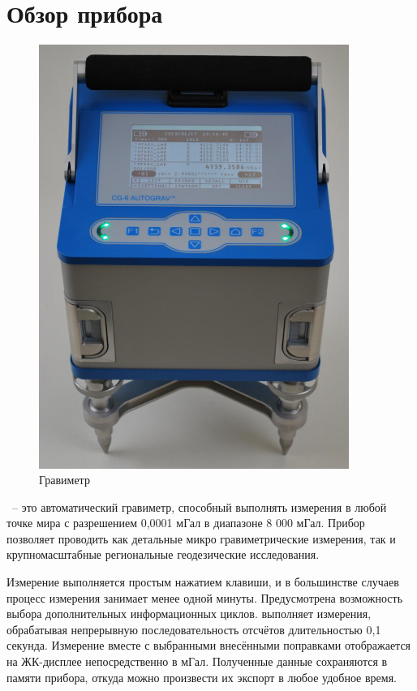 \chapter[Обзор]{Обзор прибора}
\label{chap:instrument_overview}

\begin{figure}%
  \centering
  \includegraphics[width=0.9\textwidth, height=0.9\textheight, keepaspectratio]
  {figures/cg6_autograv}
  \caption{Гравиметр \cg{}}
  \label{fig:cg6_autograv_gravity_meter}
\end{figure}

\cg{}~-- это автоматический гравиметр, способный выполнять
измерения в любой точке мира с разрешением 0,0001 мГал в диапазоне 8 000
мГал. Прибор позволяет проводить как детальные микро гравиметрические
измерения, так и крупномасштабные региональные геодезические исследования.

Измерение выполняется простым нажатием клавиши, и в большинстве случаев процесс
измерения занимает менее одной минуты. Предусмотрена возможность выбора
дополнительных информационных циклов. \cg{} выполняет измерения,
обрабатывая непрерывную последовательность отсчётов длительностью 0,1 секунда.
Измерение вместе с выбранными внесёнными поправками отображается на ЖК-дисплее
непосредственно в мГал. Полученные данные сохраняются в памяти прибора, откуда
можно произвести их экспорт в любое удобное время.

